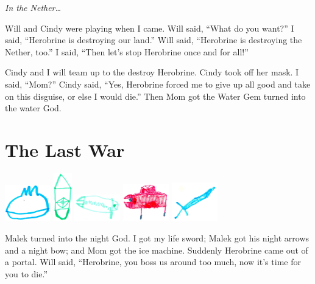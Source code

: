 \documentclass[12pt,oneside]{krantz}
\begin{document}
\emph{In the Nether\ldots{}}

Will and Cindy were playing when I came. Will said, ``What do you
want?'' I said, ``Herobrine is destroying our land.'' Will said,
``Herobrine is destroying the Nether, too.'' I said, ``Then let's stop
Herobrine once and for all!''

Cindy and I will team up to the destroy Herobrine. Cindy took off her
mask. I said, ``Mom?'' Cindy said, ``Yes, Herobrine forced me to give up
all good and take on this disguise, or else I would die.'' Then Mom got
the Water Gem turned into the water God.

\chapter{The Last War}\label{the-last-war}

\includegraphics[width=0.78125in]{img/weapons-blueball.jpg}
\includegraphics[width=0.31250in]{img/weapons-green.jpg}
\includegraphics[width=0.78125in]{img/weapons-greengun.jpg}
\includegraphics[width=0.78125in]{img/weapons-redguy.jpg}
\includegraphics[width=0.78125in]{img/weapons-sword.jpg}

Malek turned into the night God. I got my life sword; Malek got his
night arrows and a night bow; and Mom got the ice machine. Suddenly
Herobrine came out of a portal. Will said, ``Herobrine, you boss us
around too much, now it's time for you to die.''
\end{document}
